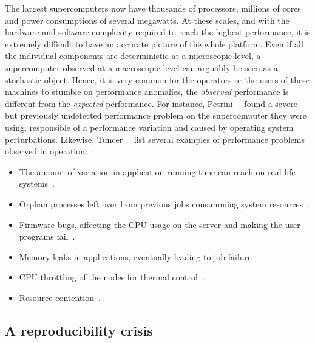             The largest supercomputers now have thousands of processors, millions of cores and power consumptions of several
            megawatts. At these scales, and with the hardware and software complexity required to reach the highest
            performance, it is extremely difficult to have an accurate picture of the whole platform. Even if all the
            individual components are deterministic at a microscopic level, a supercomputer observed at a macroscopic level
            can arguably be seen as a stochastic object. Hence, it is very common for the operators or the users of these
            machines to stumble on performance anomalies, \ie the \emph{observed} performance is different from the
            \emph{expected} performance. For instance, Petrini~\etal~\cite{Petrini_2003} found a severe but previously
            undetected performance problem on the supercomputer they were using, responsible of a 
            performance variation and caused by operating system perturbations. Likewise,
            Tuncer~\etal~\cite[Section~1]{Tuncer_2017} list several examples of performance problems observed in operation:
            \begin{itemize}
                \item The amount of variation in application running time can reach  on real-life
                    systems~\cite{Bhatele_2013,Skinner}.
                \item Orphan processes left over from previous jobs consumming system resources~\cite{Brandt_2010}.
                \item Firmware bugs, affecting the CPU usage on the server and making the user programs
                    fail~\cite{cisco_bug}.
                \item Memory leaks in applications, eventually leading to job failure~\cite{Agelastos_2015}.
                \item CPU throttling of the nodes for thermal control~\cite{Brandt2015EnablingAO}.
                \item Resource contention~\cite{Bhatele_2013,dorier:hal-00916091}.
            \end{itemize}

        \subsection{A reproducibility crisis}%
        \label{sub:reproducibility_crisis}

